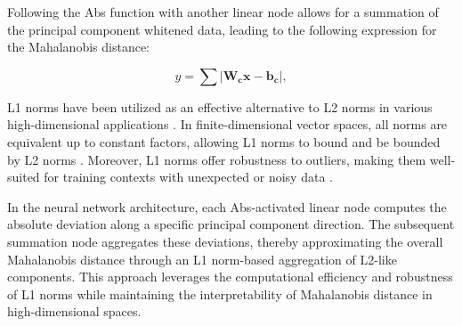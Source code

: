 Following the Abs function with another linear node allows for a summation of the principal component whitened data, leading to the following expression for the Mahalanobis distance:

\begin{equation}
    \label{eq:mahalanobis_L1}
    y = \sum \left| \mathbf{W_c} \mathbf{x} - \mathbf{b_c} \right|,
\end{equation}

L1 norms have been utilized as an effective alternative to L2 norms in various high-dimensional applications \citep{bernhardsson2018annoy}. In finite-dimensional vector spaces, all norms are equivalent up to constant factors, allowing L1 norms to bound and be bounded by L2 norms \citep{kreyszig1978introductory}. Moreover, L1 norms offer robustness to outliers, making them well-suited for training contexts with unexpected or noisy data \citep{candes2005decoding}. 

In the neural network architecture, each Abs-activated linear node computes the absolute deviation along a specific principal component direction. The subsequent summation node aggregates these deviations, thereby approximating the overall Mahalanobis distance through an L1 norm-based aggregation of L2-like components. This approach leverages the computational efficiency and robustness of L1 norms while maintaining the interpretability of Mahalanobis distance in high-dimensional spaces.
